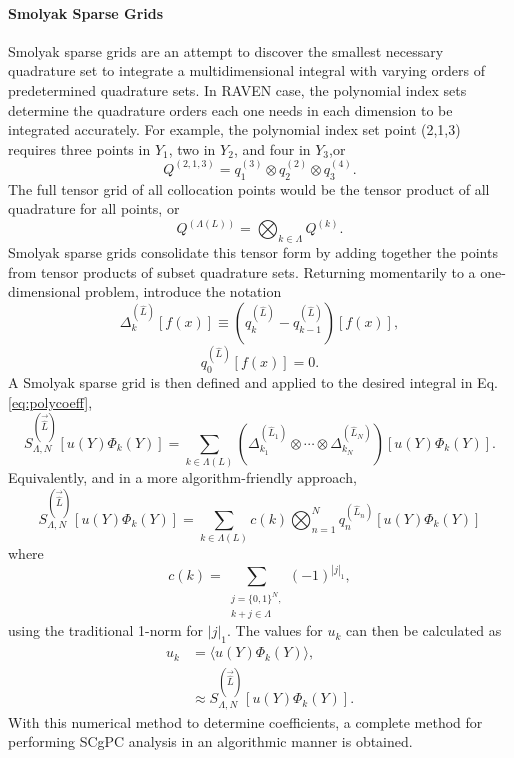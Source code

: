 \paragraph{Smolyak Sparse Grids}
Smolyak sparse grids \cite{smolyak} are an attempt to discover the smallest necessary quadrature set to
integrate a multidimensional integral with varying orders of predetermined quadrature sets.  In RAVEN case, the
polynomial index sets determine the quadrature orders each one needs in each dimension to be integrated
accurately.  For example, the polynomial index set point (2,1,3) requires three points in $Y_1$, two in $Y_2$,
and four in $Y_3$,or
\begin{equation}
  Q^{(2,1,3)} = q^{(3)}_1 \otimes q^{(2)}_2 \otimes q^{(4)}_3.
\end{equation}
The full tensor grid of all collocation points would be the tensor product of all quadrature for all points,
or
\begin{equation}
  Q^{(\Lambda(L))} = \bigotimes_{k\in\Lambda}Q^{(k)}.
\end{equation}
Smolyak sparse grids consolidate this tensor form by adding together the points from tensor products of subset
quadrature sets.  Returning momentarily to a one-dimensional problem, introduce the notation
\begin{equation}
  \Delta_k^{(\hat L)}[f(x)] \equiv (q_k^{(\hat L)} - q_{k-1}^{(\hat L)})[f(x)],
\end{equation}
\begin{equation}
  q_0^{(\hat L)}[f(x)] = 0.
\end{equation}
A Smolyak sparse grid is then defined and applied to the desired integral in Eq. \ref{eq:polycoeff},
\begin{equation}
  S^{(\vec{\hat L})}_{\Lambda,N}[u(Y)\Phi_k(Y)] = \sum_{k\in\Lambda(L)} \left(\Delta_{k_1}^{(\hat L_1)} \otimes \cdots \otimes
  \Delta_{k_N}^{(\hat L_N)}\right)[u(Y)\Phi_k(Y)].
\end{equation}
Equivalently, and in a more algorithm-friendly approach,
\begin{equation}
  S^{(\vec{\hat L})}_{\Lambda,N}[u(Y)\Phi_k(Y)] = \sum_{k\in\Lambda(L)} c(k)\bigotimes_{n=1}^N
  q^{(\hat L_n)}_n[u(Y)\Phi_k(Y)]
\end{equation}
where
\begin{equation}
  c(k) = \sum_{\substack{j=\{0,1\}^N,\\k+j\in\Lambda}} (-1)^{|j|_1},
\end{equation}
using the traditional 1-norm for $|j|_1$.
The values for $u_k$ can then be calculated as
\begin{align}
  u_k &= \langle u(Y)\Phi_k(Y) \rangle,\\
      &\approx S^{(\vec{\hat L})}_{\Lambda,N}[u(Y)\Phi_k(Y)].
\end{align}
With this numerical method to determine coefficients,  a complete method for performing SCgPC
analysis in an algorithmic manner is obtained.
